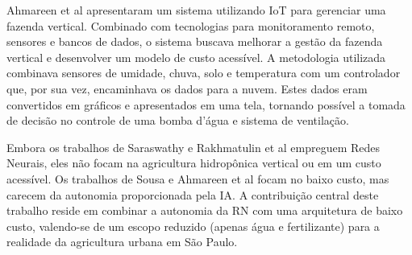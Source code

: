 Ahmareen et al \citeyear{ahmareen2024} apresentaram um sistema utilizando IoT para gerenciar uma fazenda vertical. Combinado com tecnologias para monitoramento remoto, sensores e bancos de dados, o sistema buscava melhorar a gestão da fazenda vertical e desenvolver um modelo de custo acessível. A metodologia utilizada combinava sensores de umidade, chuva, solo e temperatura com um controlador que, por sua vez, encaminhava os dados para a nuvem. Estes dados eram convertidos em gráficos e apresentados em uma tela, tornando possível a tomada de decisão no controle de uma bomba d'água e sistema de ventilação.

Embora os trabalhos de Saraswathy \citeyear{saraswathy2020} e Rakhmatulin et al \citeyear{rakhmatulin2021} empreguem Redes Neurais, eles não focam na agricultura hidropônica vertical ou em um custo acessível. Os trabalhos de Sousa \citeyear{sousa2023} e Ahmareen et al \citeyear{ahmareen2024} focam no baixo custo, mas carecem da autonomia proporcionada pela IA. A contribuição central deste trabalho reside em combinar a autonomia da RN com uma arquitetura de baixo custo, valendo-se de um escopo reduzido (apenas água e fertilizante) para a realidade da agricultura urbana em São Paulo.